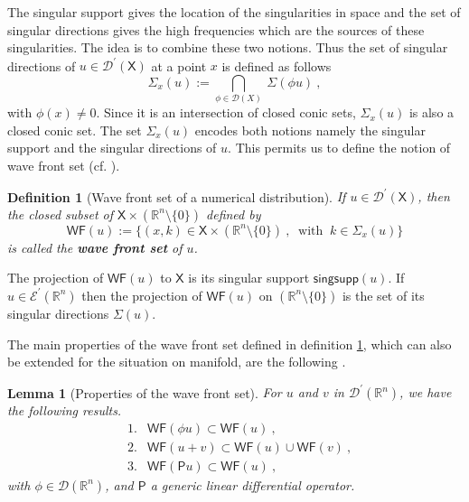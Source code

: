 \documentclass[11pt]{book}
\newcommand{\WF}{\mathsf{WF}}
\newcommand{\Dcal}{\mathcal{D}}
\newcommand{\Ecal}{\mathcal{E}}
\newcommand{\Rbb}{\mathbb{R}}
\newcommand{\Psf}{\mathsf{P}}
\newcommand{\Xsf}{\mathsf{X}}
\theoremstyle{break}
\newtheorem{lemma}{Lemma}[chapter]
\newtheorem{definition}{Definition}[chapter]
\begin{document}
The singular support gives the location of the singularities in space and the set of singular directions gives the high frequencies which are the sources of these singularities. The idea is to combine these two notions. Thus the set of singular directions of $u\in\Dcal^\prime(\Xsf)$ at a point $x$ is defined as follows
%
\begin{equation*}
\Sigma_x(u) := \underset{\phi \in \Dcal(X)}{\bigcap} \ \Sigma(\phi u) \ , 
\end{equation*}
%
with $\phi(x) \neq 0$. Since it is an intersection of closed conic sets, $\Sigma_x(u)$ is also a closed conic set. The set $\Sigma_x(u)$ encodes both notions namely the singular support and the singular directions of $u$. This permits us to define the notion of wave front set (cf. \cite{HORMANDER_1990}).


\begin{definition}[Wave front set of a numerical distribution]\label{def:wf}
If $u \in \Dcal^\prime(\Xsf)$, then the closed subset of $\Xsf \times (\Rbb^n \setminus \{0\})$ defined by
%
\begin{equation*}
\WF(u) := \bigg\{ (x,k) \in \Xsf \times (\Rbb^n \setminus \{0\}) \ , \ \mbox{ with } \ k \in \Sigma_x(u) \bigg\}
\end{equation*}
%
is called the \textbf{wave front set} of $u$.  
\end{definition}


The projection of $\WF(u)$ to $\Xsf$ is its singular support $\mathsf{singsupp}(u)$. If $u \in \Ecal^\prime(\Rbb^n)$ then the projection of $\WF(u)$ on $(\Rbb^n \setminus \{0\})$ is the set of its singular directions $\Sigma(u)$. 


The main properties of the wave front set defined in definition \ref{def:wf}, which can also be extended for the situation on manifold, are the following \cite{HORMANDER_1990}.


\begin{lemma}[Properties of the wave front set]\label{lem:prop_wf}
For $u$ and $v$ in $\Dcal^\prime(\Rbb^n)$, we have the following results.
%
\begin{eqnarray*}
&1.& \WF(\phi u) \subset \WF(u) \ , \\
&2.& \WF(u+v) \subset \WF(u) \cup \WF(v) \ , \\ 
&3.& \WF(\Psf u) \subset \WF(u) \ , 
\end{eqnarray*}
%
with $\phi\in\Dcal(\Rbb^n)$, and $\Psf$ a generic linear differential operator. 
\end{lemma}
\end{document}
